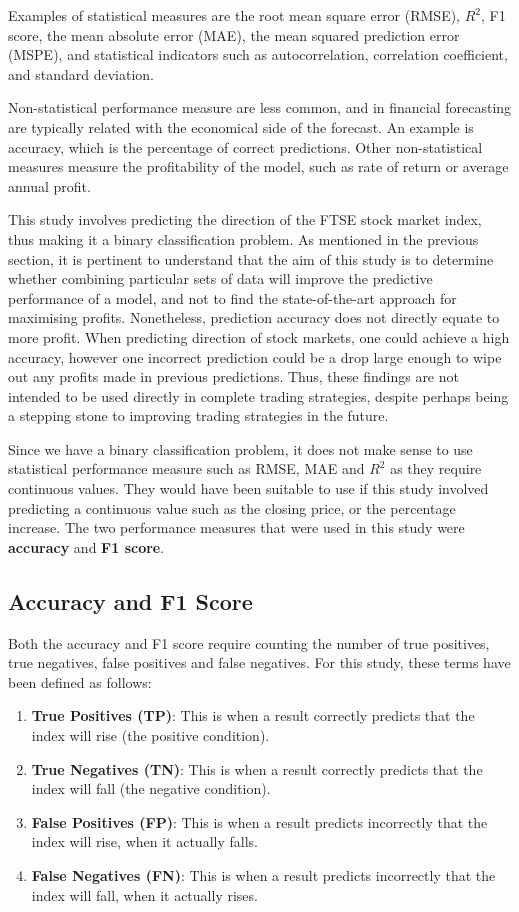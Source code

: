 \documentclass{UoYCSproject}
\begin{document}
Examples of statistical measures are the root mean square error (RMSE), $R^2$, F1 score, the mean absolute error (MAE), the mean squared prediction error (MSPE), and statistical indicators such as autocorrelation, correlation coefficient, and standard deviation. 

Non-statistical performance measure are less common, and in financial forecasting are typically related with the economical side of the forecast. An example is accuracy, which is the percentage of correct predictions. Other non-statistical measures measure the profitability of the model, such as rate of return or average annual profit.

This study involves predicting the direction of the FTSE stock market index, thus making it a binary classification problem. As mentioned in the previous section, it is pertinent to understand that the aim of this study is to determine whether combining particular sets of data will improve the predictive performance of a model, and not to find the state-of-the-art approach for maximising profits. Nonetheless, prediction accuracy does not directly equate to more profit. When predicting direction of stock markets, one could achieve a high accuracy, however one incorrect prediction could be a drop large enough to wipe out any profits made in previous predictions. Thus, these findings are not intended to be used directly in complete trading strategies, despite perhaps being a stepping stone to improving trading strategies in the future. 

Since we have a binary classification problem, it does not make sense to use statistical performance measure such as RMSE, MAE and $R^2$ as they require continuous values. They would have been suitable to use if this study involved predicting a continuous value such as the closing price, or the percentage increase. The two performance measures that were used in this study were \textbf{accuracy} and \textbf{F1 score}. 

\subsection{Accuracy and F1 Score}
\label{subsec:accuracyandf1}

Both the accuracy and F1 score require counting the number of true positives, true negatives, false positives and false negatives. For this study, these terms have been defined as follows:

\begin{enumerate}
    \item \textbf{True Positives (TP)}: This is when a result correctly predicts that the index will rise (the positive condition).
    \item \textbf{True Negatives (TN)}: This is when a result correctly predicts that the index will fall (the negative condition).
    \item \textbf{False Positives (FP)}: This is when a result predicts incorrectly that the index will rise, when it actually falls.
    \item \textbf{False Negatives (FN)}: This is when a result predicts incorrectly that the index will fall, when it actually rises.
\end{enumerate}
\end{document}
